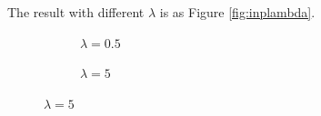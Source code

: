 \documentclass[paper=a4, fontsize=11pt]{scrartcl} %
\numberwithin{equation}{section} %
\numberwithin{figure}{section} %
\numberwithin{table}{section} %
\begin{document}
The result with different $\lambda$ is as Figure \ref{fig:inplambda}.
\vspace{-5mm}
\begin{figure}[H]
	\caption{Result with different $\lambda$ \label{fig:inplambda}}
	\centering
	\begin{subfigure}[b]{0.3\textwidth}
		\noindent{}
	\caption{$\lambda = 0.5$}
	\end{subfigure}
	\begin{subfigure}[b]{0.3\textwidth}
		\noindent{}
	\caption{$\lambda = 5$}
	\end{subfigure}

\end{figure}
\end{document}
